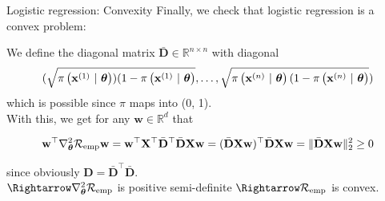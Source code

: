\documentclass[11pt,compress,t,notes=noshow, xcolor=table]{beamer}
\begin{document}
\begin{frame}{Logistic regression: Convexity}
Finally, we check that logistic regression is a convex problem:
\vfill

We define the diagonal matrix $\bar{\mathbf{D}} \in \mathbb{R}^{n \times n}$ with diagonal 
$$(\sqrt{\pixit[1])(1-\pixit[1]}, \dots, \sqrt{\pixit[n](1-\pixit[n]}) $$
which is possible since $\pi$ maps into (0, 1). \\
\vfill
With this, we get for any $\mathbf{w} \in \mathbb{R}^d$ that

$$\mathbf{w}^\top  \nabla^2_{\thetav}\riske \mathbf{w} =   \mathbf{w}^\top  \mathbf{X}^\top \bar{\mathbf{D}}^\top \bar{\mathbf{D}}\mathbf{X} \mathbf{w} = (\bar{\mathbf{D}}\mathbf{X} \mathbf{w})^\top\bar{\mathbf{D}}\mathbf{X} \mathbf{w} = \Vert \bar{\mathbf{D}}\mathbf{X} \mathbf{w} \Vert^2_2 \geq 0$$

since obviously $\mathbf{D} = \bar{\mathbf{D}}^\top \bar{\mathbf{D}}.$ \\
\vfill
$\Rightarrow \nabla^2_{\thetav}\riske$ is positive semi-definite $\Rightarrow \riske$ is convex.

\end{frame}

\endlecture
\end{document}
